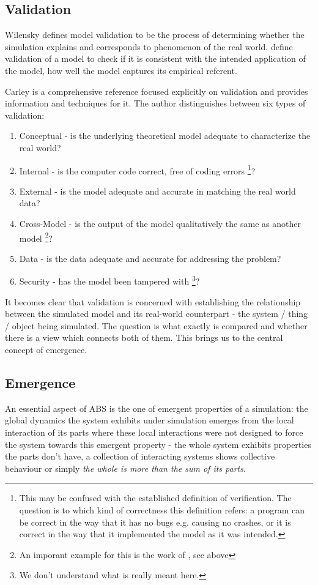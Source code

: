 \subsection{Validation}
Wilensky \cite{wilensky_making_2007} defines model validation to be the process of determining whether the simulation explains and corresponds to phenomenon of the real world. \cite{galan_errors_2009} define validation of a model to check if it is consistent with the intended application of the model, how well the model captures its empirical referent.

Carley \cite{carley_validating_1996} is a comprehensive reference focused explicitly on validation and provides information and techniques for it. The author distinguishes between six types of validation:
\begin{enumerate}
	\item Conceptual - is the underlying theoretical model adequate to characterize the real world?
	\item Internal - is the computer code correct, free of coding errors \footnote{This may be confused with the established definition of verification. The question is to which kind of correctness this definition refers: a program can be correct in the way that it has no bugs e.g. causing no crashes, or it is correct in the way that it implemented the model as it was intended.}?
	\item External - is the model adequate and accurate in matching the real world data?
	\item Cross-Model - is the output of the model qualitatively the same as another model \footnote{An imporant example for this is the work of \cite{axtell_aligning_1996}, see above}?
	\item Data - is the data adequate and accurate for addressing the problem?
	\item Security - has the model been tampered with \footnote{We don't understand what is really meant here.}?
\end{enumerate}

It becomes clear that validation is concerned with establishing the relationship between the simulated model and its real-world counterpart - the system / thing / object being simulated. The question is what exactly is compared and whether there is a view which connects both of them. This brings us to the central concept of emergence.

\subsection{Emergence}
An essential aspect of ABS is the one of emergent properties of a simulation: the global dynamics the system exhibits under simulation emerges from the local interaction of its parts where these local interactions were not designed to force the system towards this emergent property - the whole system exhibits properties the parts don't have, a collection of interacting systems shows collective behaviour \cite{baas_emergence_1997} or simply \textit{the whole is more than the sum of its parts}.

